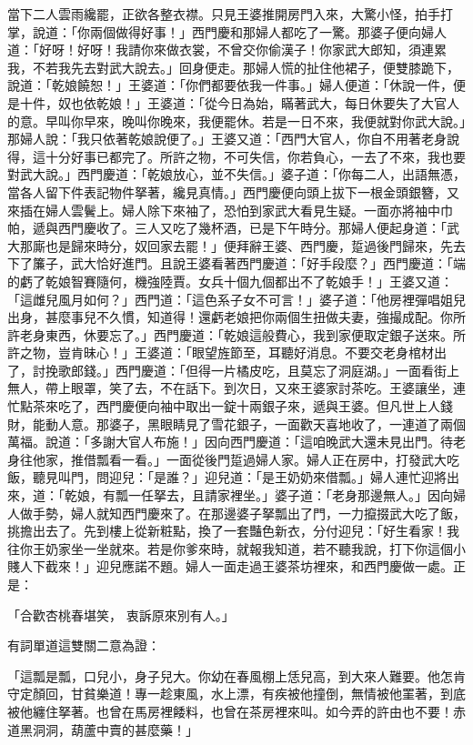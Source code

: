 \begin{showcontents}{}
當下二人雲雨纔罷，正欲各整衣襟。只見王婆推開房門入來，大驚小怪，拍手打掌，說道：「你兩個做得好事！」西門慶和那婦人都吃了一驚。那婆子便向婦人道：「好呀！好呀！我請你來做衣裳，不曾交你偷漢子！你家武大郎知，須連累我，不若我先去對武大說去。」回身便走。那婦人慌的扯住他裙子，便雙膝跪下，說道：「乾娘饒恕！」王婆道：「你們都要依我一件事。」婦人便道：「休說一件，便是十件，奴也依乾娘！」王婆道：「從今日為始，瞞著武大，每日休要失了大官人的意。早叫你早來，晚叫你晚來，我便罷休。若是一日不來，我便就對你武大說。」那婦人說：「我只依著乾娘說便了。」王婆又道：「西門大官人，你自不用著老身說得，這十分好事已都完了。所許之物，不可失信，你若負心，一去了不來，我也要對武大說。」西門慶道：「乾娘放心，並不失信。」婆子道：「你每二人，出語無憑，當各人留下件表記物件拏著，纔見真情。」西門慶便向頭上拔下一根金頭銀簪，又來插在婦人雲鬢上。婦人除下來袖了，恐怕到家武大看見生疑。一面亦將袖中巾帕，遞與西門慶收了。三人又吃了幾杯酒，已是下午時分。那婦人便起身道：「武大那廝也是歸來時分，奴回家去罷！」便拜辭王婆、西門慶，踅過後門歸來，先去下了簾子，武大恰好進門。且說王婆看著西門慶道：「好手段麼？」西門慶道：「端的虧了乾娘智賽隨何，機強陸賈。女兵十個九個都出不了乾娘手！」王婆又道：「這雌兒風月如何？」西門道：「這色系子女不可言！」婆子道：「他房裡彈唱姐兒出身，甚麼事兒不久慣，知道得！還虧老娘把你兩個生扭做夫妻，強撮成配。你所許老身東西，休要忘了。」西門慶道：「乾娘這般費心，我到家便取定銀子送來。所許之物，豈肯昧心！」王婆道：「眼望旌節至，耳聽好消息。不要交老身棺材出了，討挽歌郎錢。」西門慶道：「但得一片橘皮吃，且莫忘了洞庭湖。」一面看街上無人，帶上眼罩，笑了去，不在話下。到次日，又來王婆家討茶吃。王婆讓坐，連忙點茶來吃了，西門慶便向袖中取出一錠十兩銀子來，遞與王婆。但凡世上人錢財，能動人意。那婆子，黑眼睛見了雪花銀子，一面歡天喜地收了，一連道了兩個萬福。說道：「多謝大官人布施！」因向西門慶道：「這咱晚武大還未見出門。待老身往他家，推借瓢看一看。」一面從後門踅過婦人家。婦人正在房中，打發武大吃飯，聽見叫門，問迎兒：「是誰？」迎兒道：「是王奶奶來借瓢。」婦人連忙迎將出來，道：「乾娘，有瓢一任拏去，且請家裡坐。」婆子道：「老身那邊無人。」因向婦人做手勢，婦人就知西門慶來了。在那邊婆子拏瓢出了門，一力攛掇武大吃了飯，挑擔出去了。先到樓上從新粧點，換了一套豔色新衣，分付迎兒：「好生看家！我往你王奶家坐一坐就來。若是你爹來時，就報我知道，若不聽我說，打下你這個小賤人下截來！」迎兒應諾不題。婦人一面走過王婆茶坊裡來，和西門慶做一處。正是：

「合歡杏桃春堪笑，  衷訴原來別有人。」

有詞單道這雙關二意為證：

「這瓢是瓢，口兒小，身子兒大。你幼在春風棚上恁兒高，到大來人難要。他怎肯守定顏回，甘貧樂道！專一趁東風，水上漂，有疾被他撞倒，無情被他罣著，到底被他纏住拏著。也曾在馬房裡餧料，也曾在茶房裡來叫。如今弄的許由也不要！赤道黑洞洞，葫蘆中賣的甚麼藥！」


\end{showcontents}
